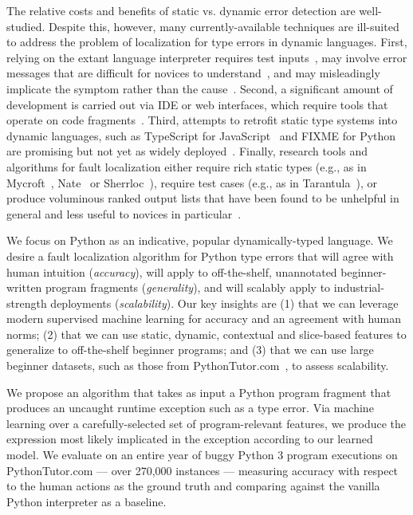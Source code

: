 \documentclass[conference]{IEEEtran}
\begin{document}
The relative costs and benefits of static vs. dynamic error detection are
well-studied. Despite this, however, many currently-available techniques
are ill-suited to address the problem of localization for type errors in
dynamic languages. First, relying on the extant language interpreter
requires test inputs~\cite{FIXME}, may involve error messages that are
difficult for novices to understand~\cite{FIXME}, and may misleadingly
implicate the symptom rather than the cause~\cite{FIXME}.  Second, a
significant amount of development is carried out via IDE or web interfaces,
which require tools that operate on code fragments~\cite{Guo2013-vu}.
Third, attempts to retrofit static type systems into dynamic languages,
such as TypeScript for JavaScript~\cite{FIXME} and FIXME for
Python~\cite{FIXME} are promising but not yet as widely
deployed~\cite{FIXME}. Finally, research tools and algorithms for fault
localization either require rich static types (e.g., as in
Mycroft~\cite{FIXME}, Nate~\cite{FIXME} or Sherrloc~\cite{FIXME}), require
test cases (e.g., as in Tarantula~\cite{FIXME}), or produce voluminous
ranked output lists that have been found to be unhelpful in general and
less useful to novices in particular~\cite[Sec.~5.1]{orso-parnin}.

We focus on Python as an indicative, popular dynamically-typed language.
We desire a fault localization algorithm for Python type errors that
will agree with human intuition (\emph{accuracy}), will apply to
off-the-shelf, unannotated beginner-written program fragments
(\emph{generality}), and will scalably apply to industrial-strength
deployments (\emph{scalability}). Our key insights are (1) that we can leverage
modern supervised machine learning for accuracy and an agreement with human
norms; (2) that we can use static, dynamic, contextual and slice-based
features to generalize to off-the-shelf beginner programs; and (3) that we
can use large beginner datasets, such as those from
PythonTutor.com~\cite{Guo2012-vu}, to assess scalability.

We propose an algorithm that takes as input a Python program fragment that
produces an uncaught runtime exception such as a type error. Via machine
learning over a carefully-selected set of program-relevant features, we
produce the expression most likely implicated in the exception according to
our learned model. We evaluate on an entire year of buggy Python 3 program
executions on PythonTutor.com --- over 270,000 instances --- measuring
accuracy with respect to the human actions as the ground truth and
comparing against the vanilla Python interpreter as a baseline.
\end{document}
